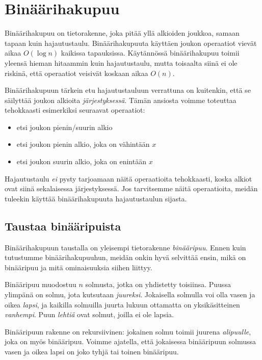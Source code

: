 \chapter{Binäärihakupuu}

Binäärihakupuu on tietorakenne, joka pitää yllä
alkioiden joukkoa, samaan tapaan kuin hajautustaulu.
Binäärihakupuuta käyttäen joukon operaatiot vievät aikaa $O(\log n)$
kaikissa tapauksissa.
Käytännössä binäärihakupuu toimii yleensä hieman hitaammin
kuin hajautustaulu, mutta toisaalta siinä ei ole riskinä,
että operaatiot veisivät koskaan aikaa $O(n)$.

Binäärihakupuun tärkein etu hajautustauluun verrattuna on kuitenkin,
että se säilyttää joukon alkioita \emph{järjestyksessä}.
Tämän ansiosta voimme toteuttaa tehokkaasti
esimerkiksi seuraavat operaatiot:

\begin{itemize}
\item etsi joukon pienin/suurin alkio
\item etsi joukon pienin alkio, joka on vähintään $x$
\item etsi joukon suurin alkio, joka on enintään $x$
\end{itemize}

Hajautustaulu \emph{ei} pysty tarjoamaan näitä operaatioita tehokkaasti,
koska alkiot ovat siinä sekalaisessa järjestyksessä.
Jos tarvitsemme näitä operaatioita,
meidän tuleekin käyttää binäärihakupuuta hajautustaulun sijasta.

\section{Taustaa binääripuista}

Binäärihakupuun taustalla on yleisempi tietorakenne \emph{binääripuu}.
Ennen kuin tutustumme binäärihakupuuhun,
meidän onkin hyvä selvittää ensin, mikä on binääripuu ja mitä
ominaisuuksia siihen liittyy.

Binääripuu muodostuu $n$ solmusta, jotka on yhdistetty toisiinsa.
Puussa ylimpänä on solmu, jota kutsutaan \emph{juureksi}.
Jokaisella solmulla voi olla vasen ja oikea \emph{lapsi},
ja kaikilla solmuilla juurta lukuun ottamatta on yksikäsitteinen \emph{vanhempi}.
Puun \emph{lehtiä} ovat solmut, joilla ei ole lapsia.

Binääripuun rakenne on rekursiivinen:
jokainen solmu toimii juurena \emph{alipuulle},
joka on myös binääripuu.
Voimme ajatella, että jokaisessa binääripuun
solmussa vasen ja oikea lapsi on joko tyhjä
tai toinen binääripuu.

